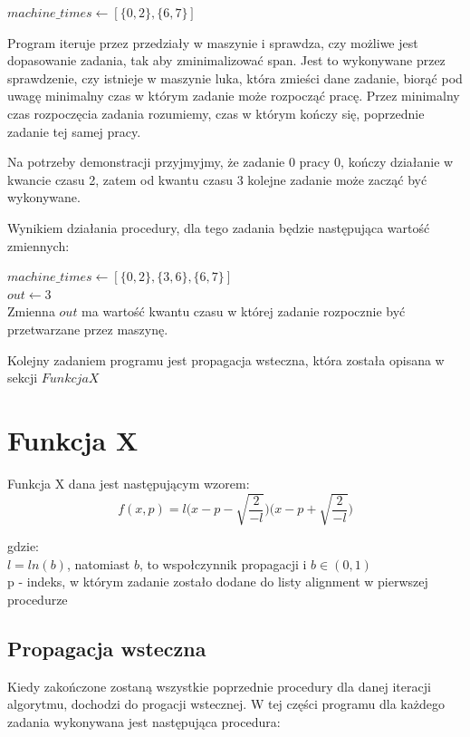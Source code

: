 \documentclass[11pt,twocolumn]{article}
\begin{document}
$machine\_times \longleftarrow [\{0,2\}, \{6,7\}]$ 

Program iteruje przez przedziały w maszynie i sprawdza, czy możliwe jest dopasowanie zadania, tak aby zminimalizować span. 
Jest to wykonywane przez sprawdzenie, czy istnieje w maszynie luka, która zmieści dane zadanie, biorąć pod uwagę minimalny czas w którym zadanie może rozpocząć pracę. Przez minimalny czas rozpoczęcia zadania rozumiemy, czas w którym kończy się, poprzednie zadanie tej samej pracy.

Na potrzeby demonstracji przyjmyjmy, że zadanie 0 pracy 0, kończy działanie w kwancie czasu 2, zatem od kwantu czasu 3 kolejne zadanie może zacząć być wykonywane. 

Wynikiem działania procedury, dla tego zadania  będzie następująca wartość zmiennych:


$machine\_times \longleftarrow [\{0,2\},\{3,6\},\{6,7\}]$ \\
$out \longleftarrow 3$ \\

Zmienna $out$ ma wartość kwantu czasu w której zadanie rozpocznie być przetwarzane przez maszynę.


Kolejny zadaniem programu jest propagacja wsteczna, która została opisana w sekcji $Funkcja  X$

\section{Funkcja X}
Funkcja X dana jest następującym wzorem:
$$f(x,p) = l\bigg( x - p - \sqrt{\frac{2}{-l}}\bigg)\bigg(x - p + \sqrt{\frac{2}{-l}}\bigg)$$

gdzie:\\
$l=ln(b)$, natomiast $b$, to wspołczynnik propagacji i $b \in (0,1)$ \\
p - indeks, w którym zadanie zostało dodane do listy alignment w pierwszej procedurze

\subsection{Propagacja wsteczna}
Kiedy zakończone zostaną wszystkie poprzednie procedury dla danej iteracji algorytmu, dochodzi do progacji wstecznej. W tej części programu dla każdego zadania wykonywana jest następująca procedura:

\begin{algorithm}
\end{algorithm}
\end{document}
